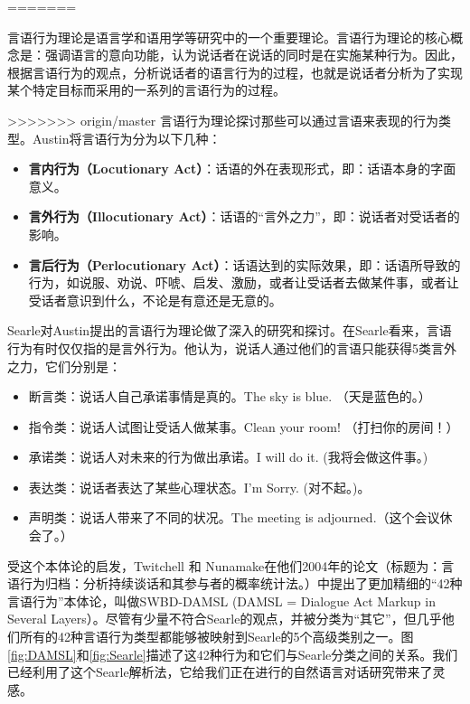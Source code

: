 =======

言语行为理论是语言学和语用学等研究中的一个重要理论。言语行为理论的核心概念是：强调语言的意向功能，认为说话者在说话的同时是在实施某种行为。因此，根据言语行为的观点，分析说话者的语言行为的过程，也就是说话者分析为了实现某个特定目标而采用的一系列的言语行为的过程。

>>>>>>> origin/master
言语行为理论探讨那些可以通过言语来表现的行为类型。Austin\cite{Austin2005}将言语行为分为以下几种：

\begin{itemize}
\item {\bf 言内行为（Locutionary Act）}：话语的外在表现形式，即：话语本身的字面意义。
\item {\bf 言外行为（Illocutionary Act）}：话语的“言外之力”，即：说话者对受话者的影响。
\item {\bf 言后行为（Perlocutionary Act）}：话语达到的实际效果，即：话语所导致的行为，如说服、劝说、吓唬、启发、激励，或者让受话者去做某件事，或者让受话者意识到什么，不论是有意还是无意的。
\end{itemize}

Searle对Austin提出的言语行为理论做了深入的研究和探讨。在Searle\cite{Searle1969}看来，言语行为有时仅仅指的是言外行为。他认为，说话人通过他们的言语只能获得5类言外之力，它们分别是：

\begin{itemize}
\item 断言类：说话人自己承诺事情是真的。The sky is blue. （天是蓝色的。）
\item 指令类：说话人试图让受话人做某事。Clean your room! （打扫你的房间！）
\item 承诺类：说话人对未来的行为做出承诺。I will do it. (我将会做这件事。)
\item 表达类：说话者表达了某些心理状态。I’m Sorry. (对不起。)。
\item 声明类：说话人带来了不同的状况。The meeting is adjourned.（这个会议休会了。）
\end{itemize}

受这个本体论的启发，Twitchell 和 Nunamake在他们2004年的论文（标题为：言语行为归档：分析持续谈话和其参与者的概率统计法。\cite{Twitchell2004}）中提出了更加精细的“42种言语行为”本体论，叫做SWBD-DAMSL (DAMSL = Dialogue Act Markup in Several Layers）。尽管有少量不符合Searle的观点，并被分类为“其它”，但几乎他们所有的42种言语行为类型都能够被映射到Searle的5个高级类别之一。图\ref{fig:DAMSL}和\ref{fig:Searle}描述了这42种行为和它们与Searle分类之间的关系。我们已经利用了这个Searle解析法，它给我们正在进行的自然语言对话研究带来了灵感。

